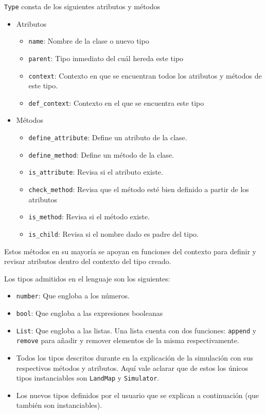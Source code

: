  \verb|Type| consta de los siguientes atributos y m\'etodos 
  \begin{itemize}
  \item Atributos
  \begin{itemize}
  \item \verb|name|: Nombre de la clase o nuevo tipo
  
  \item \verb|parent|: Tipo inmediato del cuál hereda este tipo
  
  \item \verb|context|: Contexto en que se encuentran todos los atributos y métodos de este tipo. 
  
  \item \verb|def_context|: Contexto en el que se encuentra este tipo
  \end{itemize}
  
  \item M\'etodos
  \begin{itemize}  
  \item \verb|define_attribute|: Define un atributo de la clase.
  
  \item \verb|define_method|: Define un m\'etodo de la clase.
  
  \item \verb|is_attribute|: Revisa si el atributo existe.
  
  \item \verb|check_method|: Revisa que el método esté bien definido a partir de los atributos
  
  \item \verb|is_method|: Revisa si el m\'etodo existe.
  
  \item \verb|is_child|: Revisa si el nombre dado es padre del tipo.
  \end{itemize}
  \end{itemize}
  Estos métodos en su mayoría se apoyan en funciones del contexto para definir y revisar atributos dentro del contexto del tipo creado.
  
  Los tipos admitidos en el lenguaje son los siguientes:
  
  \begin{itemize}
  	\item \verb|number|: Que engloba a los n\'umeros.
  	\item \verb|bool|: Que engloba a las expresiones booleanas
  	\item \verb|List|: Que engloba a las listas. Una lista cuenta con dos funciones: \verb|append| y \verb|remove| para a\~{n}adir y remover elementos de la misma respectivamente.
  	\item Todos los tipos descritos durante en la explicaci\'on de la simulaci\'on con sus respectivos m\'etodos y atributos. Aqu\'i vale aclarar que de estos los \'unicos tipos instanciables son \verb|LandMap| y \verb|Simulator|.
  	\item Los nuevos tipos definidos por el usuario que se explican a continuaci\'on (que tambi\'en son instanciables).
  \end{itemize}
  
